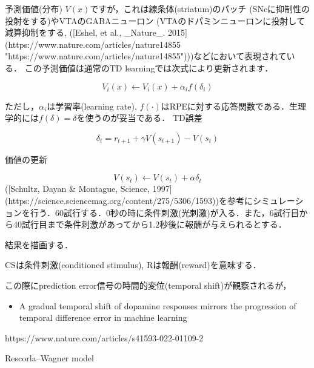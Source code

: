 予測価値(分布) $V(x)$ですが，これは線条体(striatum)のパッチ (SNcに抑制性の投射をする)やVTAのGABAニューロン (VTAのドパミンニューロンに投射して減算抑制をする, ([Eshel, et al., _Nature_. 2015](https://www.nature.com/articles/nature14855 "https://www.nature.com/articles/nature14855")))などにおいて表現されている． この予測価値は通常のTD learningでは次式により更新されます． 

 
\begin{equation}
V_{i}(x) \leftarrow V_{i}(x)+\alpha_{i} f\left(\delta_{i}\right) 
\end{equation}
 

ただし，$\alpha_{i}$は学習率(learning rate), $f(\cdot)$はRPEに対する応答関数である．生理学的には$f(\delta)=\delta$を使うのが妥当である．
TD誤差


\begin{equation}
\delta_{t} = r_{t+1} + \gamma V(s_{t+1}) - V(s_{t})
\end{equation}


価値の更新


\begin{equation}
V(s_{t}) \leftarrow V(s_{t}) + \alpha \delta_{t}
\end{equation}
([Schultz, Dayan & Montague, Science, 1997](https://science.sciencemag.org/content/275/5306/1593))を参考にシミュレーションを行う．60試行する．0秒の時に条件刺激(光刺激)が入る．また，6試行目から40試行目まで条件刺激があってから1.2秒後に報酬が与えられるとする．


結果を描画する．


CSは条件刺激(conditioned stimulus), Rは報酬(reward)を意味する．

この際にprediction error信号の時間的変位(temporal shift)が観察されるが，

\begin{itemize}
\item A gradual temporal shift of dopamine responses mirrors the progression of temporal difference error in machine learning
\end{itemize}
https://www.nature.com/articles/s41593-022-01109-2


Rescorla–Wagner model
